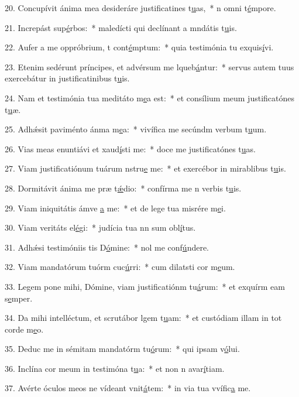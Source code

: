 20. Concupívit ánima mea desideráre justificatines t\uline{u}as,~* n omni t\uline{é}mpore.\par 
21. Increpást sup\uline{é}rbos:~* maledícti qui declínant a mndátis t\uline{u}is.\par 
22. Aufer a me oppróbrium, t cont\uline{é}mptum:~* quia testimónia tu exquis\uline{í}vi.\par 
23. Etenim sedérunt príncipes, et advérsum me lqueb\uline{á}ntur:~* servus autem tuus exercebátur in justificatinibus t\uline{u}is.\par 
24. Nam et testimónia tua meditáto m\uline{e}a est:~* et consílium meum justificatónes t\uline{u}æ.\par 
25. Adhǽsit paviménto ánma m\uline{e}a:~* vivífica me secúndm verbum t\uline{u}um.\par 
26. Vias meas enuntiávi et xaud\uline{í}sti me:~* doce me justificatónes t\uline{u}as.\par 
27. Viam justificatiónum tuárum nstru\uline{e} me:~* et exercébor in mirablibus t\uline{u}is.\par 
28. Dormitávit ánima me præ t\uline{ǽ}dio:~* confírma me n verbis t\uline{u}is.\par 
29. Viam iniquitátis ámve \uline{a} me:~* et de lege tua misrére m\uline{e}i.\par 
30. Viam veritáts el\uline{é}gi:~* judícia tua nn sum obl\uline{í}tus.\par 
31. Adhǽsi testimóniis tis D\uline{ó}mine:~* nol me conf\uline{ú}ndere.\par 
32. Viam mandatórum tuórm cuc\uline{ú}rri:~* cum dilatsti cor m\uline{e}um.\par 
33. Legem pone mihi, Dómine, viam justificatiónm tu\uline{á}rum:~* et exquírm eam s\uline{e}mper.\par 
34. Da mihi intelléctum, et scrutábor lgem t\uline{u}am:~* et custódiam illam in tot corde m\uline{e}o.\par 
35. Deduc me in sémitam mandatórm tu\uline{ó}rum:~* qui ipsam v\uline{ó}lui.\par 
36. Inclína cor meum in testimóna t\uline{u}a:~* et non n avar\uline{í}tiam.\par 
37. Avérte óculos meos ne vídeant vnit\uline{á}tem:~* in via tua vvífic\uline{a} me.\par 
